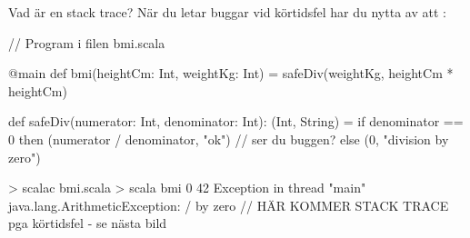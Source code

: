 \begin{Slide}{Vad är en stack trace?}\SlideFontSmall
	När du letar buggar vid körtidsfel har du nytta av att   :



	\begin{Code}[numbers=left]
		// Program i filen bmi.scala

		@main
		def bmi(heightCm: Int, weightKg: Int) =
		safeDiv(weightKg, heightCm * heightCm)

		def safeDiv(numerator: Int, denominator: Int): (Int, String) =
		if denominator == 0 then (numerator / denominator, "ok")  // ser du buggen?
		else (0, "division by zero")

	\end{Code}
	\begin{REPL}
		> scalac bmi.scala
		> scala bmi 0 42
		Exception in thread "main" java.lang.ArithmeticException: / by zero
		// HÄR KOMMER STACK TRACE pga körtidsfel - se nästa bild
	\end{REPL}
\end{Slide}


